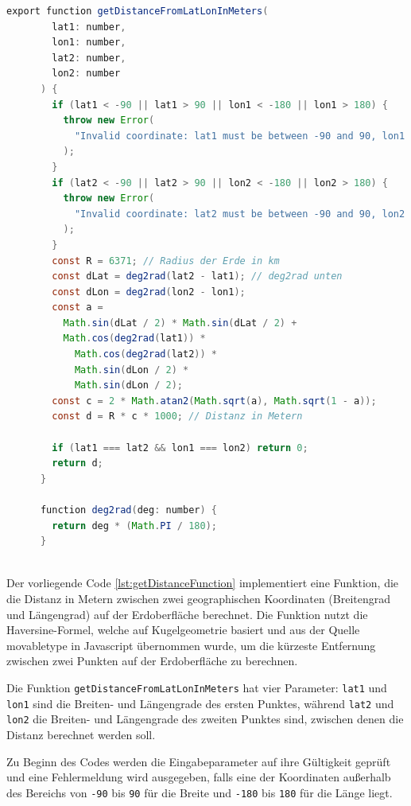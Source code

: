 \begin{lstlisting}[language=Java,caption=getDistanceFromLatLonInMeters Funktion,label=lst:getDistanceFunction]
    export function getDistanceFromLatLonInMeters(
        lat1: number,
        lon1: number,
        lat2: number,
        lon2: number
      ) {
        if (lat1 < -90 || lat1 > 90 || lon1 < -180 || lon1 > 180) {
          throw new Error(
            "Invalid coordinate: lat1 must be between -90 and 90, lon1 must be between -180 and 180"
          );
        }
        if (lat2 < -90 || lat2 > 90 || lon2 < -180 || lon2 > 180) {
          throw new Error(
            "Invalid coordinate: lat2 must be between -90 and 90, lon2 must be between -180 and 180"
          );
        }
        const R = 6371; // Radius der Erde in km
        const dLat = deg2rad(lat2 - lat1); // deg2rad unten
        const dLon = deg2rad(lon2 - lon1);
        const a =
          Math.sin(dLat / 2) * Math.sin(dLat / 2) +
          Math.cos(deg2rad(lat1)) *
            Math.cos(deg2rad(lat2)) *
            Math.sin(dLon / 2) *
            Math.sin(dLon / 2);
        const c = 2 * Math.atan2(Math.sqrt(a), Math.sqrt(1 - a));
        const d = R * c * 1000; // Distanz in Metern
      
        if (lat1 === lat2 && lon1 === lon2) return 0;
        return d;
      }
      
      function deg2rad(deg: number) {
        return deg * (Math.PI / 180);
      }
      
\end{lstlisting}
Der vorliegende Code \ref{lst:getDistanceFunction}
implementiert eine Funktion, die die
Distanz in Metern zwischen zwei geographischen Koordinaten
(Breitengrad und Längengrad) auf der Erdoberfläche
berechnet. Die Funktion nutzt die Haversine-Formel, welche auf Kugelgeometrie basiert und aus der Quelle \cite{movabletype} movabletype in Javascript übernommen wurde, um die kürzeste Entfernung zwischen zwei Punkten auf der Erdoberfläche zu berechnen.

Die Funktion \texttt{getDistanceFromLatLonInMeters} hat vier Parameter: \texttt{lat1} und \texttt{lon1} sind die Breiten- und Längengrade des ersten Punktes, während \texttt{lat2} und \texttt{lon2} die Breiten- und Längengrade des zweiten Punktes sind, zwischen denen die Distanz berechnet werden soll.

Zu Beginn des Codes werden die Eingabeparameter auf ihre Gültigkeit geprüft und eine Fehlermeldung wird ausgegeben, falls eine der Koordinaten außerhalb des Bereichs von \texttt{-90} bis \texttt{90} für die Breite und \texttt{-180} bis \texttt{180} für die Länge liegt.

